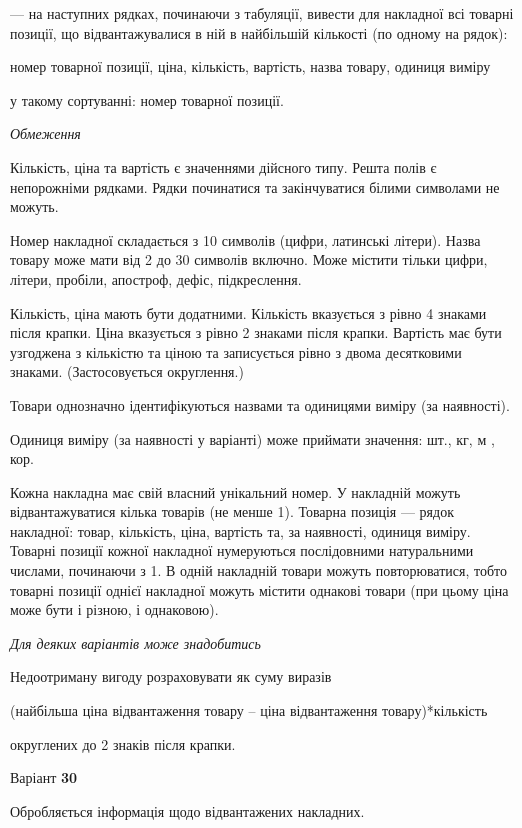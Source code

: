 \documentclass[11pt, ukrainian]{article}
\begin{document}
{\noindent}--- на наступних рядках, починаючи з табуляції, вивести для накладної всі товарні позиції, що відвантажувалися в ній в найбільшій кількості (по одному на рядок):\par
номер товарної позиції, ціна, кількість, вартість, назва товару, одиниця виміру

{\noindent}у такому сортуванні: номер товарної позиції.


\bigskip\textit{Обмеження}

Кількість, ціна та вартість є значеннями дійсного типу.
Решта полів є непорожніми рядками.
Рядки починатися та закінчуватися білими символами не можуть.

Номер накладної складається з 10 символів (цифри, латинські літери).
Назва товару може мати від 2 до 30 символів включно.
Може містити тільки цифри, літери, пробіли, апостроф, дефіс, підкреслення.

Кількість, ціна мають бути додатними.
Кількість вказується з рівно 4 знаками після крапки.
Ціна вказується з рівно 2 знаками після крапки.
Вартість має бути узгоджена з кількістю та ціною та записується рівно з двома десятковими знаками.
(Застосовується округлення.)

Товари однозначно ідентифікуються назвами та одиницями виміру (за наявності).

Одиниця виміру (за наявності у варіанті) може приймати значення: шт., кг, м , кор.

Кожна накладна має свій власний унікальний номер.
У накладній можуть відвантажуватися кілька товарів (не менше 1).
Товарна позиція --- рядок накладної: товар, кількість, ціна, вартість та, за наявності, одиниця виміру.
Товарні позиції кожної накладної нумеруються послідовними натуральними числами, починаючи з 1.
В одній накладній товари можуть повторюватися, 
тобто товарні позиції однієї накладної можуть містити однакові товари 
(при цьому ціна може бути і різною, і однаковою).

\bigskip\textit{Для деяких варіантів може знадобитись}

Недоотриману вигоду розраховувати як суму виразів
{\center (найбільша ціна відвантаження товару – ціна відвантаження товару)*кількість\par}

\bigskip
{\noindent} округлених до 2 знаків після крапки.


\par
\newpage
{\center Варіант  \No \textbf { 30 }\par}
\bigskip
Обробляється інформація щодо відвантажених накладних.
\end{document}

